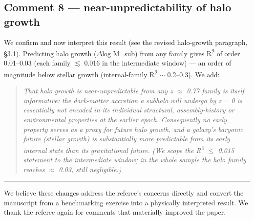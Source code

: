\documentclass[11pt]{article}
\begin{document}
\subsection*{Comment 8 --- near-unpredictability of halo growth}
We confirm and now interpret this result (see the revised halo-growth paragraph, \S{}3.1). Predicting halo growth ($\Delta$log M\_sub) from any family gives R\textsuperscript{2} of order 0.01--0.03 (each family $\lesssim$ 0.016 in the intermediate window) --- an order of magnitude below stellar growth (internal-family R\textsuperscript{2} $\sim$ 0.2--0.3). We add:

\begin{quote}\itshape
That halo growth is near-unpredictable from any z $\approx$ 0.77 family is itself informative: the dark-matter accretion a subhalo will undergo by z = 0 is essentially not encoded in its individual structural, assembly-history or environmental properties at the earlier epoch. Consequently no early property serves as a proxy for future halo growth, and a galaxy's baryonic future (stellar growth) is substantially more predictable from its early internal state than its gravitational future. (We scope the R\textsuperscript{2} $\leq$ 0.015 statement to the intermediate window; in the whole sample the halo family reaches $\approx$ 0.03, still negligible.)
\end{quote}

\bigskip\hrule\bigskip
We believe these changes address the referee's concerns directly and convert the manuscript from a benchmarking exercise into a physically interpreted result. We thank the referee again for comments that materially improved the paper.
\end{document}
